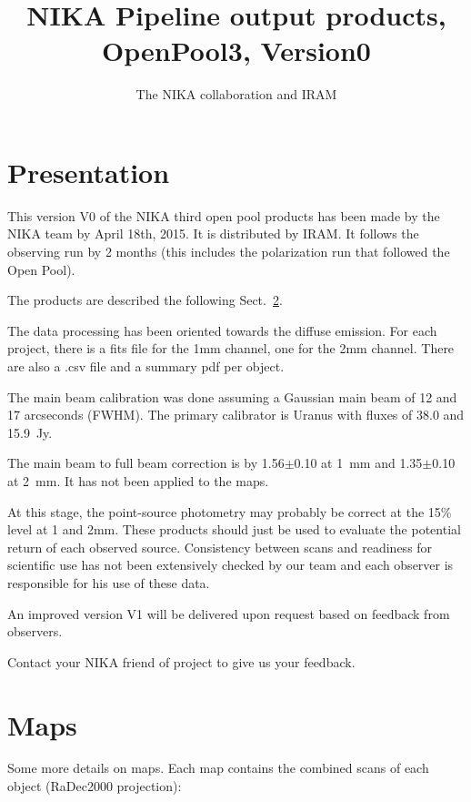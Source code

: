 \documentclass[a4paper,10pt]{article}
\title{NIKA Pipeline output products, OpenPool3, Version0}
\author{The NIKA collaboration and IRAM}
\begin{document}
\maketitle


\section{Presentation}

This version V0 of the NIKA third open pool products has been made by the
NIKA team by April 18th, 2015.  It is distributed by IRAM. It follows the
observing run by 2 months (this includes the polarization run that followed the
Open Pool).

The products are described the following Sect.~\ref{sec:maps}.

The data processing has been oriented towards the diffuse emission. For each
project, there is a fits file for the 1mm channel, one for the 2mm
channel. There are also a .csv file and a summary pdf per object.

The main beam calibration was done assuming a Gaussian main beam of 12 and
17 arcseconds (FWHM). The primary calibrator is Uranus with fluxes of 38.0
and 15.9~Jy.

The main beam to full beam correction is by 1.56$\pm$0.10 at 1~mm and
1.35$\pm$0.10 at 2~mm. It has not been applied to the maps.

At this stage, the point-source photometry may probably be correct at the 15\%
level at 1 and 2mm. These products should just be used to evaluate the potential
return of each observed source. Consistency between scans and readiness for
scientific use has not been extensively checked by our team and each observer is
responsible for his use of these data.

An improved version V1 will be delivered upon request based on feedback from observers.
 
Contact your NIKA friend of project to give us your feedback. 

\section{Maps}\label{sec:maps}
Some more details on maps. Each map contains the combined scans of each object
(RaDec2000 projection):
\end{document}
